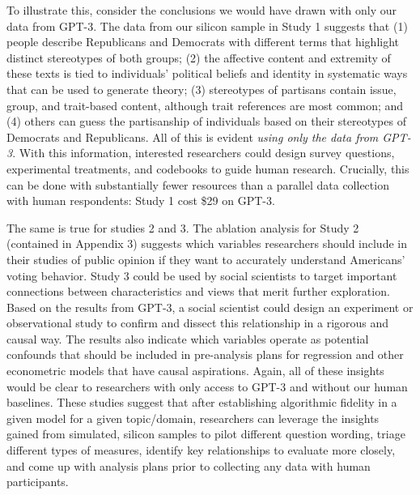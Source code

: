 \documentclass[11pt]{article}
\begin{document}
To illustrate this, consider the conclusions we would have drawn with only our data from GPT-3. The data from our silicon sample in Study 1 suggests that (1) people describe Republicans and Democrats with different terms that highlight distinct stereotypes of both groups; (2) the affective content and extremity of these texts is tied to individuals' political beliefs and identity in systematic ways that can be used to generate theory; (3) stereotypes of partisans contain issue, group, and trait-based content, although trait references are most common; and (4) others can guess the partisanship of individuals based on their stereotypes of Democrats and Republicans. All of this is evident \textit{using only the data from GPT-3}. With this information, interested researchers could design survey questions, experimental treatments, and codebooks to guide human research. Crucially, this can be done with substantially fewer resources than a parallel data collection with human respondents: Study 1 cost \$29 on GPT-3.

The same is true for studies 2 and 3. %
The ablation analysis for Study 2 (contained in Appendix 3) suggests which variables researchers should include in their studies of public opinion if they want to accurately understand Americans' voting behavior. Study 3 could be used by social scientists to target important connections between characteristics and views that merit further exploration. Based on the results from GPT-3, a social scientist could design an experiment or observational study to confirm and dissect this relationship in a rigorous and causal way. The results also indicate which variables operate as potential confounds that should be included in pre-analysis plans for regression and other econometric models that have causal aspirations. Again, all of these insights would be clear to researchers with only access to GPT-3 and without our human baselines. These studies suggest that after establishing algorithmic fidelity in a given model for a given topic/domain, researchers can leverage the insights gained from simulated, silicon samples to pilot different question wording, triage different types of measures, identify key relationships to evaluate more closely, and come up with analysis plans prior to collecting any data with human participants.
\end{document}
